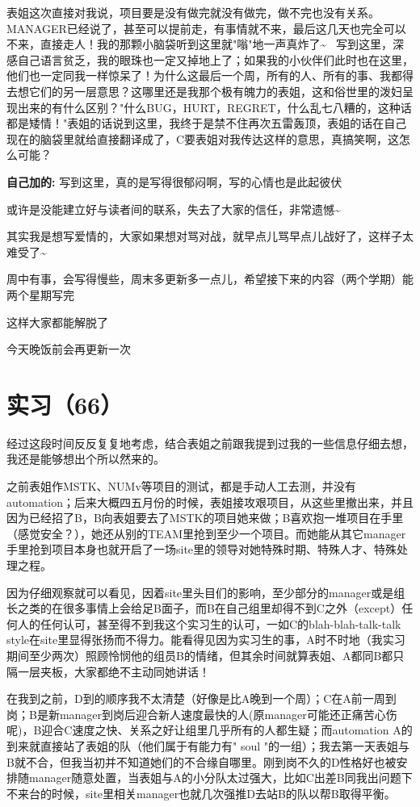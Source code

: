 \documentclass[12pt]{book}
\begin{document}
表姐这次直接对我说，项目要是没有做完就没有做完，做不完也没有关系。MANAGER已经说了，甚至可以提前走，有事情就不来，最后这几天也完全可以不来，直接走人！我的那颗小脑袋听到这里就"嗡"地一声真炸了\textasciitilde{}~ 写到这里，深感自己语言贫乏，我的眼珠也一定又掉地上了；如果我的小伙伴们此时也在这里，他们也一定同我一样惊呆了！为什么这最后一个周，所有的人、所有的事、我都得去想它们的另一层意思？这哪里还是我那个极有魄力的表姐，这和俗世里的泼妇呈现出来的有什么区别？"什么BUG，HURT，REGRET，什么乱七八糟的，这种话都是矮情！"表姐的话说到这里，我终于是禁不住再次五雷轰顶，表姐的话在自己现在的脑袋里就给直接翻译成了，C要表姐对我传达这样的意思，真搞笑啊，这怎么可能？

\textbf{自己加的:} 写到这里，真的是写得很郁闷啊，写的心情也是此起彼伏

或许是没能建立好与读者间的联系，失去了大家的信任，非常遗憾\textasciitilde{}~

其实我是想写爱情的，大家如果想对骂对战，就早点儿骂早点儿战好了，这样子太难受了\textasciitilde{}~

周中有事，会写得慢些，周末多更新多一点儿，希望接下来的内容（两个学期）能两个星期写完

这样大家都能解脱了

今天晚饭前会再更新一次

\section{实习（66）}
\label{sec-5-69}

经过这段时间反反复复地考虑，结合表姐之前跟我提到过我的一些信息仔细去想，我还是能够想出个所以然来的。

之前表姐作MSTK、NUMv等项目的测试，都是手动人工去测，并没有automation；后来大概四五月份的时候，表姐接攻艰项目，从这些里撤出来，并且因为已经招了B，B向表姐要去了MSTK的项目她来做；B喜欢抱一堆项目在手里（感觉安全？），她还从别的TEAM里抢到至少一个项目。而她能从其它manager手里抢到项目本身也就开启了一场site里的领导对她特殊时期、特殊人才、特殊处理之程。

因为仔细观察就可以看见，因着site里头目们的影响，至少部分的manager或是组长之类的在很多事情上会给足B面子，而B在自己组里却得不到C之外（except）任何人的任何认可，甚至得不到我这个实习生的认可，一如C的blah-blah-talk-talk style在site里显得张扬而不得力。能看得见因为实习生的事，A时不时地（我实习期间至少两次）照顾怜悯他的组员B的情绪，但其余时间就算表姐、A都同B都只隔一层夹板，大家都绝不主动同她讲话！

在我到之前，D到的顺序我不太清楚（好像是比A晚到一个周）；C在A前一周到岗；B是新manager到岗后迎合新人速度最快的人(原manager可能还正痛苦心伤呢)，B迎合C速度之快、关系之好让组里几乎所有的人都生疑；而automation A的到来就直接站了表姐的队（他们属于有能力有" soul "的一组）；我去第一天表姐与B就不合，但我当初并不知道她们的不合缘自哪里。刚到岗不久的D性格好也被安排随manager随意处置，当表姐与A的小分队太过强大，比如C出差B同我出问题下不来台的时候，site里相关manager也就几次强推D去站B的队以帮B取得平衡。
\end{document}
